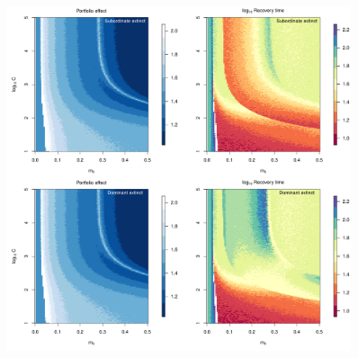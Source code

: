 \documentclass{revtex4}
\begin{document}
\begin{figure}
  \captionsetup{justification=raggedright,
singlelinecheck=false
}
\centering
\includegraphics[width=0.9\textwidth]{fig_rtpe_ddmsl.pdf}
\caption{
} \label{fig:pertlh}
\end{figure}

% 
% 
% 
\end{document}
